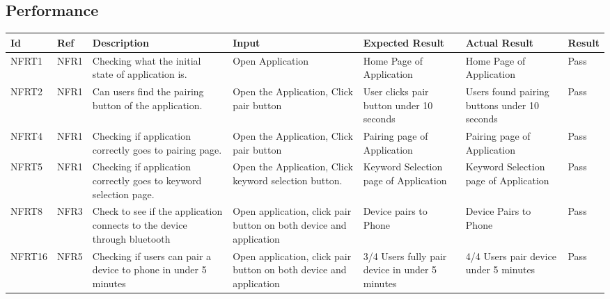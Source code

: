 \documentclass[12pt, titlepage]{article}
\begin{document}
\subsection{Performance}


\begin{longtable}{|p{1.4cm}|p{1cm}|p{3cm}|p{1.5cm}|p{2.5cm}|p{2cm}|p{1.2cm}|}
  \hline
  \textbf{Id} & \textbf{Ref} & \textbf{Description}                                                         & \textbf{Input}                                    & \textbf{Expected Result}    & \textbf{Actual Result}                          & \textbf{Result}                                     \\ \hline
  NFRT1        & NFR1          & Checking what the initial state of application is.              & Open Application                          & Home Page of Application                      & Home Page of Application                        & {\color[HTML]{32CB00} Pass}                         \\ \hline
  NFRT2        & NFR1          & Can users find the pairing button of the application.           & Open the Application, Click pair button   & User clicks pair button under 10 seconds      & Users found pairing buttons under 10 seconds    & {\color[HTML]{32CB00} Pass}                         \\ \hline
  NFRT4        & NFR1          & Checking if application correctly goes to pairing page.         & Open the Application, Click pair button   & Pairing page of Application                   & Pairing page of Application                     & {\color[HTML]{32CB00} Pass}                         \\ \hline
  NFRT5        & NFR1          & Checking if application correctly goes to keyword selection page.& Open the Application, Click keyword selection button.& Keyword Selection page of Application& Keyword Selection page of Application        & {\color[HTML]{32CB00} Pass}                         \\ \hline
  NFRT8        & NFR3          & Check to see if the application connects to the device through bluetooth& Open application, click pair button on both device and application&Device pairs to Phone&Device Pairs to Phone                       & {\color[HTML]{32CB00} Pass}                        \\ \hline
  NFRT16       & NFR5          & Checking if users can pair a device to phone in under 5 minutes  & Open application, click pair button on both device and application& 3/4 Users fully pair device in under 5 minutes& 4/4 Users pair device under 5 minutes&{\color[HTML]{32CB00} Pass}            \\ \hline

\end{longtable}
\end{document}
